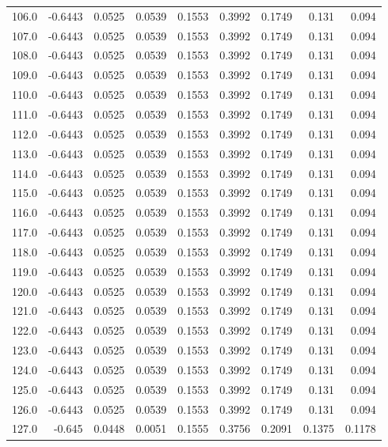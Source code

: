 \begin{longtable}{lrrrrrrrr}
106.0 & -0.6443 & 0.0525 & 0.0539 & 0.1553 & 0.3992 & 0.1749 & 0.131 & 0.094 \\
107.0 & -0.6443 & 0.0525 & 0.0539 & 0.1553 & 0.3992 & 0.1749 & 0.131 & 0.094 \\
108.0 & -0.6443 & 0.0525 & 0.0539 & 0.1553 & 0.3992 & 0.1749 & 0.131 & 0.094 \\
109.0 & -0.6443 & 0.0525 & 0.0539 & 0.1553 & 0.3992 & 0.1749 & 0.131 & 0.094 \\
110.0 & -0.6443 & 0.0525 & 0.0539 & 0.1553 & 0.3992 & 0.1749 & 0.131 & 0.094 \\
111.0 & -0.6443 & 0.0525 & 0.0539 & 0.1553 & 0.3992 & 0.1749 & 0.131 & 0.094 \\
112.0 & -0.6443 & 0.0525 & 0.0539 & 0.1553 & 0.3992 & 0.1749 & 0.131 & 0.094 \\
113.0 & -0.6443 & 0.0525 & 0.0539 & 0.1553 & 0.3992 & 0.1749 & 0.131 & 0.094 \\
114.0 & -0.6443 & 0.0525 & 0.0539 & 0.1553 & 0.3992 & 0.1749 & 0.131 & 0.094 \\
115.0 & -0.6443 & 0.0525 & 0.0539 & 0.1553 & 0.3992 & 0.1749 & 0.131 & 0.094 \\
116.0 & -0.6443 & 0.0525 & 0.0539 & 0.1553 & 0.3992 & 0.1749 & 0.131 & 0.094 \\
117.0 & -0.6443 & 0.0525 & 0.0539 & 0.1553 & 0.3992 & 0.1749 & 0.131 & 0.094 \\
118.0 & -0.6443 & 0.0525 & 0.0539 & 0.1553 & 0.3992 & 0.1749 & 0.131 & 0.094 \\
119.0 & -0.6443 & 0.0525 & 0.0539 & 0.1553 & 0.3992 & 0.1749 & 0.131 & 0.094 \\
120.0 & -0.6443 & 0.0525 & 0.0539 & 0.1553 & 0.3992 & 0.1749 & 0.131 & 0.094 \\
121.0 & -0.6443 & 0.0525 & 0.0539 & 0.1553 & 0.3992 & 0.1749 & 0.131 & 0.094 \\
122.0 & -0.6443 & 0.0525 & 0.0539 & 0.1553 & 0.3992 & 0.1749 & 0.131 & 0.094 \\
123.0 & -0.6443 & 0.0525 & 0.0539 & 0.1553 & 0.3992 & 0.1749 & 0.131 & 0.094 \\
124.0 & -0.6443 & 0.0525 & 0.0539 & 0.1553 & 0.3992 & 0.1749 & 0.131 & 0.094 \\
125.0 & -0.6443 & 0.0525 & 0.0539 & 0.1553 & 0.3992 & 0.1749 & 0.131 & 0.094 \\
126.0 & -0.6443 & 0.0525 & 0.0539 & 0.1553 & 0.3992 & 0.1749 & 0.131 & 0.094 \\
127.0 & -0.645 & 0.0448 & 0.0051 & 0.1555 & 0.3756 & 0.2091 & 0.1375 & 0.1178 \\

\end{longtable}
